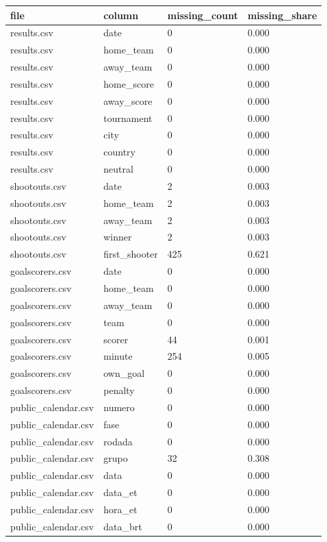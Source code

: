 \begin{tabular}{llll}
\toprule
file & column & missing\_count & missing\_share \\
\midrule
results.csv & date & 0 & 0.000 \\
results.csv & home\_team & 0 & 0.000 \\
results.csv & away\_team & 0 & 0.000 \\
results.csv & home\_score & 0 & 0.000 \\
results.csv & away\_score & 0 & 0.000 \\
results.csv & tournament & 0 & 0.000 \\
results.csv & city & 0 & 0.000 \\
results.csv & country & 0 & 0.000 \\
results.csv & neutral & 0 & 0.000 \\
shootouts.csv & date & 2 & 0.003 \\
shootouts.csv & home\_team & 2 & 0.003 \\
shootouts.csv & away\_team & 2 & 0.003 \\
shootouts.csv & winner & 2 & 0.003 \\
shootouts.csv & first\_shooter & 425 & 0.621 \\
goalscorers.csv & date & 0 & 0.000 \\
goalscorers.csv & home\_team & 0 & 0.000 \\
goalscorers.csv & away\_team & 0 & 0.000 \\
goalscorers.csv & team & 0 & 0.000 \\
goalscorers.csv & scorer & 44 & 0.001 \\
goalscorers.csv & minute & 254 & 0.005 \\
goalscorers.csv & own\_goal & 0 & 0.000 \\
goalscorers.csv & penalty & 0 & 0.000 \\
public\_calendar.csv & numero & 0 & 0.000 \\
public\_calendar.csv & fase & 0 & 0.000 \\
public\_calendar.csv & rodada & 0 & 0.000 \\
public\_calendar.csv & grupo & 32 & 0.308 \\
public\_calendar.csv & data & 0 & 0.000 \\
public\_calendar.csv & data\_et & 0 & 0.000 \\
public\_calendar.csv & hora\_et & 0 & 0.000 \\
public\_calendar.csv & data\_brt & 0 & 0.000 \\

\end{tabular}
